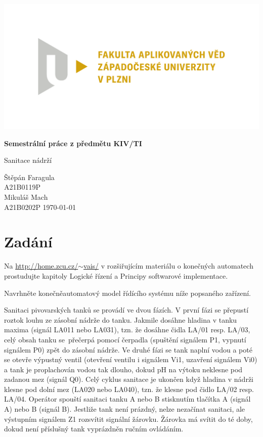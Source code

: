 \documentclass[12pt]{report}
\begin{document}
	
	\begin{titlepage}
		\centering
		\Large
		
		\includegraphics[width=.7\textwidth]{fav}
		
		\vspace{15mm}
		{\Huge\bfseries Semestrální práce z předmětu KIV/TI}
		
		\vspace{5mm}
		{\LARGE Sanitace nádrží}
		
		\vfill
		\raggedright
		Štěpán Faragula\\
		A21B0119P\\
		Mikuláš Mach\\
		A21B0202P
		\hfill 
		\today
	\end{titlepage}
	
	\tableofcontents
	
	\chapter{Zadání}
	Na \href{http://home.zcu.cz/~vais/}{http://home.zcu.cz/$\sim$vais/} v rozšiřujícím materiálu o konečných automatech prostudujte kapitoly Logické řízení a Principy softwarové implementace.
	
	Navrhněte konečněautomatový model řídícího systému níže popsaného zařízení.
	
	Sanitaci pivovarských tanků se provádí ve dvou fázích. V první fázi se přepustí roztok louhu ze zásobní nádrže do tanku. Jakmile dosáhne hladina v tanku maxima (signál LA011 nebo LA031), tzn. že dosáhne čidla LA/01 resp. LA/03, celý obsah tanku se~přečerpá pomocí čerpadla (spuštění signálem P1, vypnutí signálem P0) zpět do zásobní nádrže. Ve druhé fázi se tank naplní vodou a poté se otevře výpustný ventil (otevření ventilu i signálem Vi1, uzavření signálem Vi0) a tank je proplachován vodou tak dlouho, dokud pH na výtoku neklesne pod zadanou mez (signál Q0). Celý cyklus sanitace je ukončen když hladina v nádrži klesne pod dolní mez (LA020 nebo LA040), tzn. že klesne pod čidlo LA/02 resp. LA/04. Operátor spouští sanitaci tanku A nebo B stisknutím tlačítka A (signál A) nebo B (signál B). Jestliže tank není prázdný, nelze nezačínat sanitaci, ale výstupním signálem Z1 rozsvítit signální žárovku. Žárovka má svítit do té doby, dokud není příslušný tank vyprázdněn ručním ovládáním.
	
\end{document}
